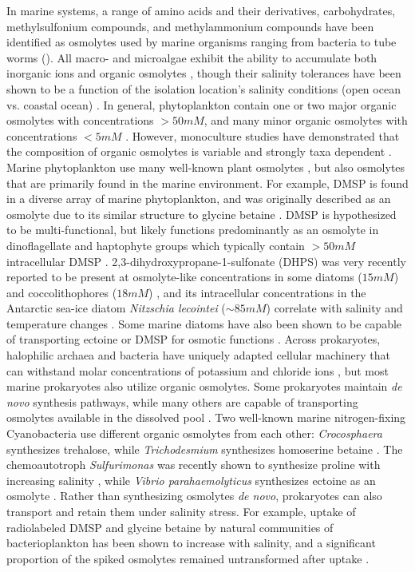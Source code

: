 \documentclass[utf8]{frontiersSCNS} %
\begin{document}
In marine systems, a range of amino acids and their derivatives, carbohydrates, methylsulfonium compounds, and methylammonium compounds have been identified as osmolytes used by marine organisms ranging from bacteria to tube worms \citep{Yancey2005} (). All macro- and microalgae exhibit the ability to accumulate both inorganic ions and organic osmolytes \citep{Bisson1995}, though their salinity tolerances have been shown to be a function of the isolation location's salinity conditions (open ocean vs. coastal ocean) \citep{Brand1984,Kirst1989}. In general, phytoplankton contain one or two major organic osmolytes with concentrations $> 50mM$, and many minor organic osmolytes with concentrations $< 5mM$ \citep{Gebser2013}. However, monoculture studies have demonstrated that the composition of organic osmolytes is variable and strongly taxa dependent \citep{Dickson1987,Dickson1987.2}. Marine phytoplankton use many well-known plant osmolytes \citep{Yancey2005}, but also osmolytes that are primarily found in the marine environment. For example, DMSP is found in a diverse array of marine phytoplankton, and was originally described as an osmolyte due to its similar structure to glycine betaine \citep{Andreae1986}. DMSP is hypothesized to be multi-functional, but likely functions predominantly as an osmolyte in dinoflagellate and haptophyte groups which typically contain $>50mM$ intracellular DMSP \citep{Keller1989,Stefels2000,McParland2020}. 2,3-dihydroxypropane-1-sulfonate (DHPS) was very recently reported to be present at osmolyte-like concentrations in some diatoms ($15mM$) and coccolithophores ($18mM$) \citep{Durham2019}, and its intracellular concentrations in the Antarctic sea-ice diatom \emph{Nitzschia lecointei} ($\sim 85mM$) correlate with salinity and temperature changes \citep{Dawson2020}. Some marine diatoms have also been shown to be capable of transporting ectoine or DMSP for osmotic functions \citep{Spielmeyer2011,Lavoie2018,Fenizia2020}. Across prokaryotes, halophilic archaea and bacteria have uniquely adapted cellular machinery that can withstand molar concentrations of potassium and chloride ions \citep{Roebler2001}, but most marine prokaryotes also utilize organic osmolytes. Some prokaryotes maintain \emph{de novo} synthesis pathways, while many others are capable of transporting osmolytes available in the dissolved pool \citep{Poli2017,Poretsky2010}. Two well-known marine nitrogen-fixing Cyanobacteria use different organic osmolytes from each other: \emph{Crocosphaera} synthesizes trehalose, while \emph{Trichodesmium} synthesizes homoserine betaine \citep{Pade2012,Pade2016}. The chemoautotroph \emph{Sulfurimonas} was recently shown to synthesize proline with increasing salinity \citep{Gotz2018}, while \emph{Vibrio parahaemolyticus} synthesizes ectoine as an osmolyte \citep{Ongagna-Yhombi2013}. Rather than synthesizing osmolytes \emph{de novo}, prokaryotes can also transport and retain them under salinity stress. For example, uptake of radiolabeled DMSP and glycine betaine by natural communities of bacterioplankton has been shown to increase with salinity, and a significant proportion of the spiked osmolytes remained untransformed after uptake \citep{Kiene1998,Motard-Cote2015}.
\end{document}
